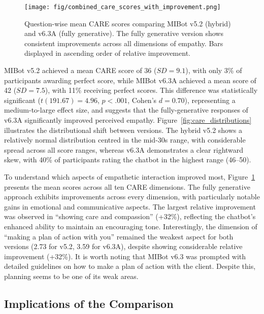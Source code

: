 \begin{figure}[htbp]
    \centering
    \texttt{[image: fig/combined\_care\_scores\_with\_improvement.png]}
    \caption{Question-wise mean CARE scores comparing MIBot v5.2 (hybrid) and v6.3A (fully generative). The fully generative version shows consistent improvements across all dimensions of empathy. Bars displayed in ascending order of relative improvement.}
    \label{fig:care_questions}
\end{figure}

 MIBot v5.2 achieved a mean CARE score of 36 ($SD = 9.1$), with only 3\% of participants awarding perfect score, while MIBot v6.3A achieved a mean score of 42 ($SD = 7.5$), with 11\% receiving perfect scores. This difference was statistically significant ($t(191.67) = 4.96$, $p < .001$, Cohen's $d = 0.70$), representing a medium-to-large effect size, and suggests that the fully-generative  responses of v6.3A significantly improved perceived empathy. Figure~\ref{fig:care_distributions} illustrates the distributional shift between versions. The hybrid v5.2 shows a relatively normal distribution centred in the mid-30s range, with considerable spread across all score ranges, whereas v6.3A demonstrates a clear rightward skew, with 40\% of participants rating the chatbot in the highest range (46--50).

To understand which aspects of empathetic interaction improved most, Figure~\ref{fig:care_questions} presents the mean scores across all ten CARE dimensions. The fully generative approach exhibits improvements across every dimension, with particularly notable gains in emotional and communicative aspects. The largest relative improvement was observed in ``showing care and compassion'' (+32\%), reflecting the chatbot's enhanced ability to maintain an encouraging tone. Interestingly, the dimension of ``making a plan of action with you'' remained the weakest aspect for both versions (2.73 for v5.2, 3.59 for v6.3A), despite showing considerable relative improvement (+32\%). It is worth noting that MIBot v6.3 was prompted with detailed guidelines on how to make a plan of action with the client. Despite this, planning seems to be one of its weak areas.



\subsection{Implications of the Comparison}

